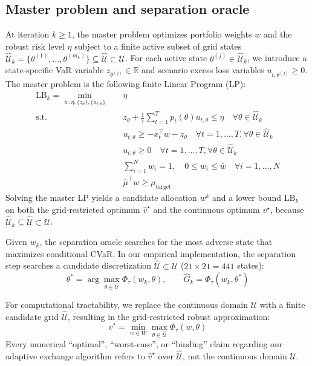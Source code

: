 \documentclass[11pt, a4paper]{article}
\begin{document}
\subsection{Master problem and separation oracle}
At iteration $k \ge 1$, the master problem optimizes portfolio weights $w$ and the robust risk level $\eta$ subject to a finite active subset of grid states $\widehat{\mathcal{U}}_k = \{\theta^{(1)}, \dots, \theta^{(m_k)}\} \subseteq \widehat{\mathcal{U}} \subset \mathcal{U}$. For each active state $\theta^{(j)} \in \widehat{\mathcal{U}}_k$, we introduce a state-specific VaR variable $z_{\theta^{(j)}} \in \mathbb{R}$ and scenario excess loss variables $u_{t, \theta^{(j)}} \ge 0$. The master problem is the following finite Linear Program (LP):
\begin{align}
    \text{LB}_k = \min_{w, \eta, \{z_\theta\}, \{u_{t,\theta}\}} \quad & \eta \\
    \text{s.t.} \quad & z_\theta + \frac{1}{\tau} \sum_{t=1}^{T} p_t(\theta) u_{t,\theta} \le \eta \quad \forall \theta \in \widehat{\mathcal{U}}_k \\
    & u_{t,\theta} \ge -x_t^\top w - z_\theta \quad \forall t=1,\dots,T, \forall \theta \in \widehat{\mathcal{U}}_k \\
    & u_{t,\theta} \ge 0 \quad \forall t=1,\dots,T, \forall \theta \in \widehat{\mathcal{U}}_k \\
    & \sum_{i=1}^N w_i = 1, \quad 0 \le w_i \le \bar{w} \quad \forall i=1,\dots,N \\
    & \hat{\mu}^\top w \ge \mu_{\text{target}}
\end{align}
Solving the master LP yields a candidate allocation $w^k$ and a lower bound $\text{LB}_k$ on both the grid-restricted optimum $\widehat v^\star$ and the continuous optimum $v^\star$, because $\widehat{\mathcal{U}}_k\subseteq\widehat{\mathcal{U}}\subset\mathcal{U}$.

Given $w_k$, the separation oracle searches for the most adverse state that maximizes conditional CVaR. In our empirical implementation, the separation step searches a candidate discretization $\widehat{\mathcal{U}} \subset \mathcal{U}$ ($21\times21 = 441$ states):
\begin{equation}
    \theta^* = \arg\max_{\theta \in \widehat{\mathcal{U}}} \Phi_\tau(w_k, \theta), \qquad \widehat{G}_k = \Phi_\tau(w_k, \theta^*)
\end{equation}

For computational tractability, we replace the continuous domain $\mathcal{U}$ with a finite candidate grid $\widehat{\mathcal{U}}$, resulting in the grid-restricted robust approximation:
\begin{equation}
    \widehat{v}^\star = \min_{w \in W} \max_{\theta \in \widehat{\mathcal{U}}} \Phi_\tau(w, \theta)
\end{equation}
Every numerical ``optimal'', ``worst-case'', or ``binding'' claim regarding our adaptive exchange algorithm refers to $\widehat{v}^\star$ over $\widehat{\mathcal{U}}$, not the continuous domain $\mathcal{U}$.
\end{document}
